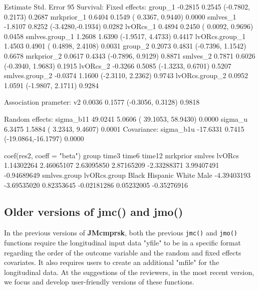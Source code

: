 \begin{example}
                  Estimate   Std. Error       95%
Survival:
 Fixed effects:
  group_1        -0.2815      0.2545      (-0.7802, 0.2173)      0.2687
  mrkprior_1     0.6404       0.1549      ( 0.3367, 0.9440)      0.0000
  smlves_1       -1.8107      0.8252      (-3.4280,-0.1934)      0.0282
  lvORcs_1       0.4894       0.2450      ( 0.0092, 0.9696)      0.0458
  smlves.group_1 1.2608       1.6390      (-1.9517, 4.4733)      0.4417
  lvORcs.group_1 1.4503       0.4901      ( 0.4898, 2.4108)      0.0031
  group_2        0.2073       0.4831      (-0.7396, 1.1542)      0.6678
  mrkprior_2     0.0617       0.4343      (-0.7896, 0.9129)      0.8871
  smlves_2       0.7871       0.6026      (-0.3940, 1.9683)      0.1915
  lvORcs_2       -0.3266      0.5085      (-1.3233, 0.6701)      0.5207
  smlves.group_2 -0.0374      1.1600      (-2.3110, 2.2362)      0.9743
  lvORcs.group_2 0.0952       1.0591      (-1.9807, 2.1711)      0.9284

Association prameter:
  v2             0.0036       0.1577      (-0.3056, 0.3128)      0.9818

Random effects:
  sigma_b11      49.0241       5.0606      ( 39.1053, 58.9430)      0.0000
  sigma_u        6.3475       1.5884      ( 3.2343, 9.4607)      0.0001
 Covariance:
  sigma_b1u      -17.6331      0.7415      (-19.0864,-16.1797)      0.0000
\end{example}

\begin{example}
coef(res2, coeff = "beta")
       group        time3        time6       time12     mrkprior       smlves       lvORcs
  1.14302264   2.46065107   2.63095850   2.87165209  -2.33288371   3.99407491  -0.94689649
smlves.group lvORcs.group        Black     Hispanic        White         Male
 -4.39403193  -3.69535020   0.82353645  -0.02181286   0.05232005  -0.35276916
\end{example}

\subsection{Older versions of jmc() and jmo()}
In the previous versions of \textbf{JMcmprsk}, both the previous \texttt{jmc()} and \texttt{jmo()} functions require the longitudinal input data "yfile" to be in a specific format regarding the order of the outcome variable and  the random and fixed effects covariates. It also requires users to create an additional "mfile" for the longitudinal data. At the suggestions of the reviewers, in the most recent version, we focus and develop user-friendly versions of these functions.

